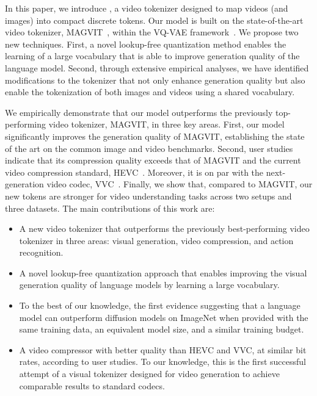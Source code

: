 In this paper, we introduce \modelname{}, a video tokenizer designed to map videos (and images) into compact discrete tokens. Our model is built on the state-of-the-art video tokenizer, MAGVIT~\citep{yu2022magvit}, within the VQ-VAE framework~\citep{van2017neural}. We propose two new techniques. First, a novel lookup-free quantization method enables the learning of a large vocabulary that is able to improve generation quality of the language model.
Second, through extensive empirical analyses, we have identified modifications to the tokenizer that not only enhance generation quality but also enable the tokenization of both images and videos using a shared vocabulary.

We empirically demonstrate that our model outperforms the previously top-performing video tokenizer, MAGVIT, in three key areas. First, our model significantly improves the generation quality of MAGVIT, establishing the state of the art on the common image and video benchmarks. Second, user studies indicate that its compression quality exceeds that of MAGVIT and the current video compression standard, HEVC~\citep{sullivan2012overview}. Moreover, it is on par with the next-generation video codec, VVC~\citep{vvc}.
Finally, we show that, compared to MAGVIT, our new tokens are stronger for video understanding tasks across two setups and three datasets.
The main contributions of this work are:
\vspace{-2mm}
\begin{itemize}[nosep, leftmargin=*]
\item A new video tokenizer that outperforms the previously best-performing video tokenizer in three areas: visual generation, video compression, and action recognition.
\item A novel lookup-free quantization approach that enables improving the visual generation quality of language models by learning a large vocabulary.
\item To the best of our knowledge, the first evidence suggesting that a language model can outperform diffusion models on ImageNet when provided with the same training data, an equivalent model size, and a similar training budget.
\item A video compressor with better quality than HEVC and VVC, at similar bit rates, according to user studies. To our knowledge, this is the first successful attempt of a visual tokenizer designed for video generation to achieve comparable results to standard codecs.
\end{itemize}

